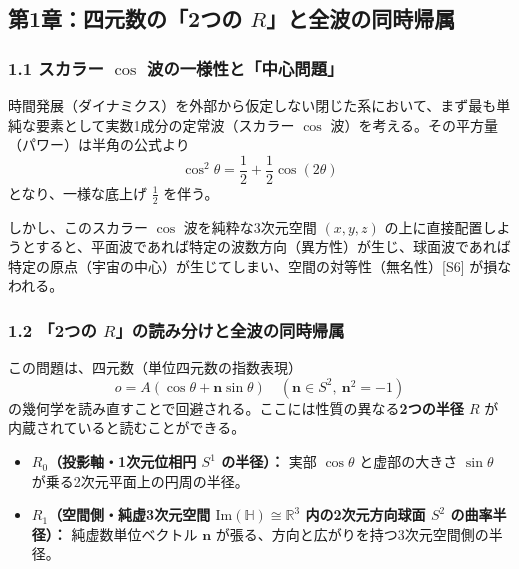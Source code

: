\documentclass[
  a4paper,
]{ltjsarticle}
\providecommand{\tightlist}{%
  \setlength{\itemsep}{0pt}\setlength{\parskip}{0pt}}
\begin{document}
\subsection{\texorpdfstring{第1章：四元数の「2つの
\(R\)」と全波の同時帰属}{第1章：四元数の「2つの R」と全波の同時帰属}}\label{ux7b2c1ux7ae0ux56dbux5143ux6570ux306e2ux3064ux306e-rux3068ux5168ux6ce2ux306eux540cux6642ux5e30ux5c5e}

\subsubsection{\texorpdfstring{1.1 スカラー \(\cos\)
波の一様性と「中心問題」}{1.1 スカラー \textbackslash cos 波の一様性と「中心問題」}}\label{ux30b9ux30abux30e9ux30fc-cos-ux6ce2ux306eux4e00ux69d8ux6027ux3068ux4e2dux5fc3ux554fux984c}

時間発展（ダイナミクス）を外部から仮定しない閉じた系において、まず最も単純な要素として実数1成分の定常波（スカラー
\(\cos\) 波）を考える。その平方量（パワー）は半角の公式より
\[\cos^2\theta = \frac{1}{2} + \frac{1}{2}\cos(2\theta)\]
となり、一様な底上げ \(\frac{1}{2}\) を伴う。

しかし、このスカラー \(\cos\) 波を純粋な3次元空間 \((x, y, z)\)
の上に直接配置しようとすると、平面波であれば特定の波数方向（異方性）が生じ、球面波であれば特定の原点（宇宙の中心）が生じてしまい、空間の対等性（無名性）{[}S6{]}
が損なわれる。

\subsubsection{\texorpdfstring{1.2 「2つの
\(R\)」の読み分けと全波の同時帰属}{1.2 「2つの R」の読み分けと全波の同時帰属}}\label{ux3064ux306e-rux306eux8aadux307fux5206ux3051ux3068ux5168ux6ce2ux306eux540cux6642ux5e30ux5c5e}

この問題は、四元数（単位四元数の指数表現）
\[o = A(\cos\theta + \mathbf{n}\sin\theta) \quad (\mathbf{n} \in S^2,\ \mathbf{n}^2 = -1)\]
の幾何学を読み直すことで回避される。ここには性質の異なる\textbf{2つの半径
\(R\)} が内蔵されていると読むことができる。

\begin{itemize}
\tightlist
\item
  \textbf{\(R_0\)（投影軸・1次元位相円 \(S^1\) の半径）：} 実部
  \(\cos\theta\) と虚部の大きさ \(\sin\theta\)
  が乗る2次元平面上の円周の半径。
\item
  \textbf{\(R_1\)（空間側・純虚3次元空間
  \(\mathrm{Im}(\mathbb{H}) \cong \mathbb{R}^3\) 内の2次元方向球面
  \(S^2\) の曲率半径）：} 純虚数単位ベクトル \(\mathbf{n}\)
  が張る、方向と広がりを持つ3次元空間側の半径。
\end{itemize}
\end{document}
